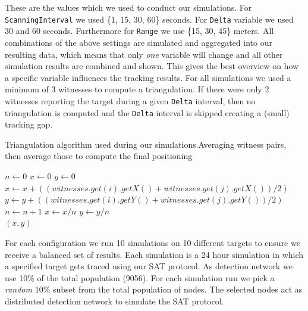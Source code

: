 \documentclass[10pt,titlepage]{article}
\begin{document}
\vspace{0.5cm} These are the values which we used to conduct our simulations. For \texttt{ScanningInterval} we used \{1, 15, 30, 60\} seconds. For \texttt{Delta} variable we used 30 and 60 seconds. Furthermore for \texttt{Range} we use \{15, 30, 45\} meters. All combinations of the above settings are simulated and aggregated into our resulting data, which
means that only \textit{one} variable will change and all other simulation results are combined and shown. This gives the best overview on how  a specific variable influences the tracking results. For all simulations we used a minimum of 3 witnesses to compute a triangulation. If there were only 2 witnesses reporting the target during a given \texttt{Delta} interval, then no triangulation is computed and the \texttt{Delta} interval is skipped creating a (small) tracking gap.\\

\begin{algorithm}
\caption{Triangulation algorithm used during our simulations.\newline Averaging witness pairs, then average those to compute the final positioning}\label{sat-triag}
\label{alg:triag}
\begin{algorithmic}[1]
\State $n \gets 0$ 
\State $x \gets 0$
\State $y \gets 0$
 
  \State $x \gets x + ((witnesses.get(i).getX() + witnesses.get(j).getX()) / 2)$
  \State $y \gets y + ((witnesses.get(i).getY() + witnesses.get(j).getY()) / 2)$
  \State $n \gets n + 1$
\EndIf
\EndFor
\EndFor
\State $x \gets x / n$ 
\State $y \gets y / n$\\
\Return $(x , y)$


\EndProcedure
\end{algorithmic}
\end{algorithm}


For each configuration we run 10 simulations on 10 different targets to ensure we receive a balanced set of results. Each simulation is a 24 hour simulation in which a specified target gets traced using our SAT protocol. As detection network we use 10\% of the total population (9056). For each simulation run we pick a \textit{random} 10\% subset from the total population of nodes. The selected nodes act as distributed detection network to simulate the SAT protocol.\\
\end{document}

